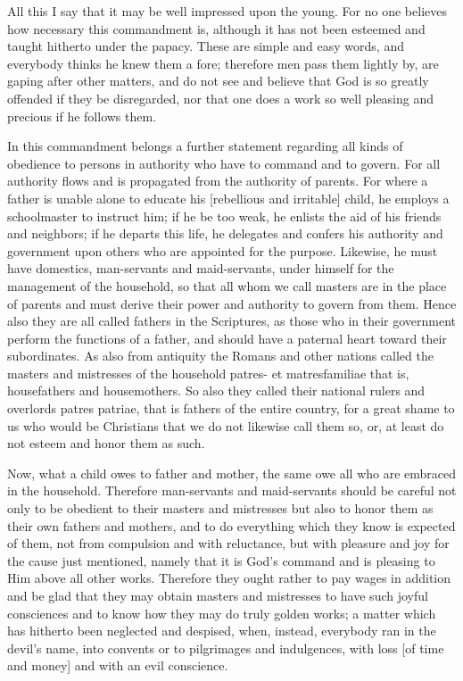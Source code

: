 All this I say that it may be well impressed upon the young. For no one
believes how necessary this commandment is, although it has not been
esteemed and taught hitherto under the papacy. These are simple and
easy words, and everybody thinks he knew them a fore; therefore men
pass them lightly by, are gaping after other matters, and do not see
and believe that God is so greatly offended if they be disregarded, nor
that one does a work so well pleasing and precious if he follows them.

In this commandment belongs a further statement regarding all kinds of
obedience to persons in authority who have to command and to govern.
For all authority flows and is propagated from the authority of
parents. For where a father is unable alone to educate his [rebellious
and irritable] child, he employs a schoolmaster to instruct him; if he
be too weak, he enlists the aid of his friends and neighbors; if he
departs this life, he delegates and confers his authority and
government upon others who are appointed for the purpose. Likewise, he
must have domestics, man-servants and maid-servants, under himself for
the management of the household, so that all whom we call masters are
in the place of parents and must derive their power and authority to
govern from them. Hence also they are all called fathers in the
Scriptures, as those who in their government perform the functions of a
father, and should have a paternal heart toward their subordinates. As
also from antiquity the Romans and other nations called the masters and
mistresses of the household patres- et matresfamiliae that is,
housefathers and housemothers. So also they called their national
rulers and overlords patres patriae, that is fathers of the entire
country, for a great shame to us who would be Christians that we do not
likewise call them so, or, at least do not esteem and honor them as
such.

Now, what a child owes to father and mother, the same owe all who are
embraced in the household. Therefore man-servants and maid-servants
should be careful not only to be obedient to their masters and
mistresses but also to honor them as their own fathers and mothers, and
to do everything which they know is expected of them, not from
compulsion and with reluctance, but with pleasure and joy for the cause
just mentioned, namely that it is God's command and is pleasing to Him
above all other works. Therefore they ought rather to pay wages in
addition and be glad that they may obtain masters and mistresses to
have such joyful consciences and to know how they may do truly golden
works; a matter which has hitherto been neglected and despised, when,
instead, everybody ran in the devil's name, into convents or to
pilgrimages and indulgences, with loss [of time and money] and with an
evil conscience.

